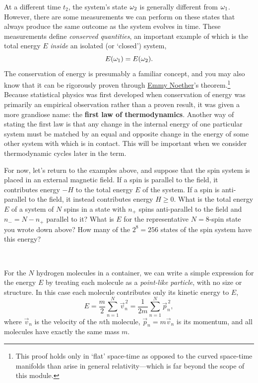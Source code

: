 At a different time $t_2$, the system's state $\omega_2$ is generally different from $\omega_1$.
However, there are some measurements we can perform on these states that always produce the same outcome as the system evolves in time.
These measurements define \textit{conserved quantities}, an important example of which is the total energy $E$ \textit{inside} an isolated (or `closed') system,
\begin{equation*}
  E(\omega_1) = E(\omega_2).
\end{equation*}
The conservation of energy is presumably a familiar concept, and you may also know that it can be rigorously proven through \href{https://en.wikipedia.org/wiki/Emmy_Noether}{Emmy Noether}'s theorem.\footnote{This proof holds only in `flat' space-time as opposed to the curved space-time manifolds than arise in general relativity---which is far beyond the scope of this module.}
Because statistical physics was first developed when conservation of energy was primarily an empirical observation rather than a proven result, it was given a more grandiose name: the \textbf{first law of thermodynamics}.
Another way of stating the first law is that any change in the internal energy of one particular system \Om must be matched by an equal and opposite change in the energy of some other system with which \Om is in contact.
This will be important when we consider thermodynamic cycles later in the term.

For now, let's return to the examples above, and suppose that the spin system is placed in an external magnetic field.
If a spin is parallel to the field, it contributes energy $-H$ to the total energy $E$ of the system.
If a spin is anti-parallel to the field, it instead contributes energy $H \geq 0$.
What is the total energy $E$ of a system of $N$ spins in a state with $n_+$ spins anti-parallel to the field and $n_- = N - n_+$ parallel to it?
What is $E$ for the representative $N = 8$-spin state you wrote down above?
How many of the $2^8 = 256$ states of the spin system have this energy?
\begin{mdframed}
  \ \\[100 pt]
\end{mdframed}
For the $N$ hydrogen molecules in a container, we can write a simple expression for the energy $E$ by treating each molecule as a \textit{point-like particle}, with no size or structure.
In this case each molecule contributes only its kinetic energy to $E$,
\begin{equation*}
  E = \frac{m}{2} \sum_{n = 1}^N \vec{v}_n^{\,2} = \frac{1}{2m} \sum_{n = 1}^N \vec{p}_n^{\,2},
\end{equation*}
where $\vec v_n$ is the velocity of the $n$th molecule, $\vec p_n = m \vec v_n$ is its momentum, and all molecules have exactly the same mass $m$.

